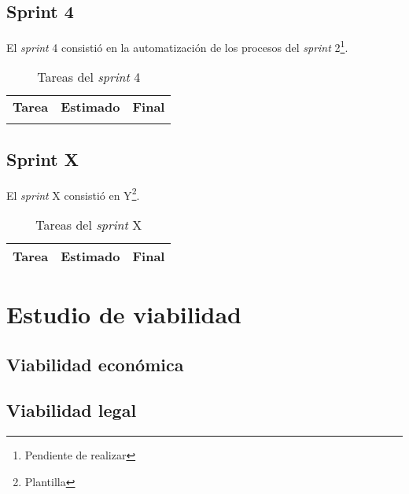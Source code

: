 \subsection{Sprint 4}

El \textit{sprint} 4 consistió en la automatización de los procesos del \textit{sprint} 2\footnote{Pendiente de realizar}. 

\begin{table}[H]
	\begin{tabularx}{\linewidth}{X r r}
		\toprule \textbf{Tarea} & \textbf{Estimado} & \textbf{Final}\\
		\otoprule
		\bottomrule
	\end{tabularx}
	\caption{Tareas del \textit{sprint} 4}
	\label{tab:sprint4}
\end{table}


\subsection{Sprint X}

El \textit{sprint} X consistió en Y\footnote{Plantilla}. 

\begin{table}[H]
	\begin{tabularx}{\linewidth}{X r r}
		\toprule \textbf{Tarea} & \textbf{Estimado} & \textbf{Final}\\
		\toprule
		\bottomrule
	\end{tabularx}
	\caption{Tareas del \textit{sprint} X}
	\label{tab:sprintx}
\end{table}


\section{Estudio de viabilidad}

\subsection{Viabilidad económica}

\subsection{Viabilidad legal}


